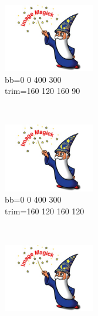 \begin{figure}[h]
\begin{subfigure}[b]{0.3\textwidth}
        \label{essai_6}
    \end{subfigure}
    \\
    \begin{subfigure}[b]{0.3\textwidth}
        \includegraphics[bb=0 0 400 300,trim=160 120 160 90,width=4cm,height=3cm,clip=true]{test.jpg}
        \caption{bb=0 0 400 300\\trim=160 120 160 90}%
        \label{essai_7}
    \end{subfigure}
    ~
    \begin{subfigure}[b]{0.3\textwidth}
        \includegraphics[bb=0 0 400 300,trim=160 120 160 120,width=4cm,height=3cm,clip=true]{test.jpg}
        \caption{bb=0 0 400 300\\trim=160 120 160 120}
        \label{essai_8}
    \end{subfigure}
    ~
    \begin{subfigure}[b]{0.3\textwidth}
        \includegraphics[bb=0 0 400 300,trim=160 120 160 150,width=4cm,height=3cm,clip=true]{test.jpg}

\end{subfigure}
\end{figure}
